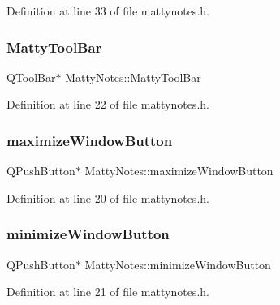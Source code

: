 Definition at line 33 of file mattynotes.\+h.

\hypertarget{classMattyNotes_ac780e9814bcce6c80afb9cc22d2b9af6}{}\label{classMattyNotes_ac780e9814bcce6c80afb9cc22d2b9af6} 
\subsubsection{\texorpdfstring{Matty\+Tool\+Bar}{MattyToolBar}}
{\footnotesize\ttfamily Q\+Tool\+Bar$\ast$ Matty\+Notes\+::\+Matty\+Tool\+Bar}



Definition at line 22 of file mattynotes.\+h.

\hypertarget{classMattyNotes_a489ab2a613831dd27ba01eccf323235a}{}\label{classMattyNotes_a489ab2a613831dd27ba01eccf323235a} 
\subsubsection{\texorpdfstring{maximize\+Window\+Button}{maximizeWindowButton}}
{\footnotesize\ttfamily Q\+Push\+Button$\ast$ Matty\+Notes\+::maximize\+Window\+Button}



Definition at line 20 of file mattynotes.\+h.

\hypertarget{classMattyNotes_a7d7fc5932df5ad6d5cee0fffe2a2feef}{}\label{classMattyNotes_a7d7fc5932df5ad6d5cee0fffe2a2feef} 
\subsubsection{\texorpdfstring{minimize\+Window\+Button}{minimizeWindowButton}}
{\footnotesize\ttfamily Q\+Push\+Button$\ast$ Matty\+Notes\+::minimize\+Window\+Button}



Definition at line 21 of file mattynotes.\+h.

\hypertarget{classMattyNotes_aa697392317715f04e4bc011090bebdb5}{}\label{classMattyNotes_aa697392317715f04e4bc011090bebdb5} 
